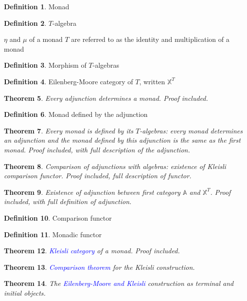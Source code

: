 \documentclass{tufte-handout} %
\theoremstyle{theorem}
\newtheorem{thm}{Theorem}[subsection]
\theoremstyle{definition}
\newtheorem{defn}[thm]{Definition}
\theoremstyle{remark}
\theoremstyle{remark}
\begin{document}
		\begin{defn} Monad
		\end{defn}
		\begin{defn} $T$-algebra
		\end{defn} $\eta$ and $\mu$ of a monad $T$ are referred to as the identity and multiplication of a monad
		\begin{defn} Morphism of $T$-algebras
		\end{defn}
		\begin{defn} Eilenberg-Moore category of $ T $, written $\mathbb{X}^T $
		\end{defn}
		\begin{thm} Every adjunction determines a monad. \textit{Proof included.}
		\end{thm}
		\begin{defn} Monad defined by the adjunction
		\end{defn}
		\begin{thm} Every monad is defined by its $ T $-algebras: every monad determines an adjunction and the monad defined by this adjunction is the same as the first monad. \textit{Proof included, with full description of the adjunction.}
		\end{thm}
		\begin{thm} Comparison of adjunctions with algebras: existence of Kleisli comparison functor. \textit{Proof included, full description of functor.}
		\end{thm}
		\begin{thm} Existence of adjunction between first category $ \mathbb{A} $ and $\mathbb{X}^T $. \textit{Proof included, with full definition of adjunction.}
		\end{thm}
		\begin{defn} Comparison functor
		\end{defn}
		\begin{defn} Monadic functor
		\end{defn}
		\begin{thm} \textcolor{blue}{Kleisli category} of a monad. \textit{Proof included.}
		\end{thm}
		\begin{thm} \textcolor{blue}{Comparison theorem} for the Kleisli construction.
		\end{thm}
		\begin{thm} The \textcolor{blue}{Eilenberg-Moore and Kleisli} construction as terminal and initial objects.
		\end{thm}
		
\end{document}
